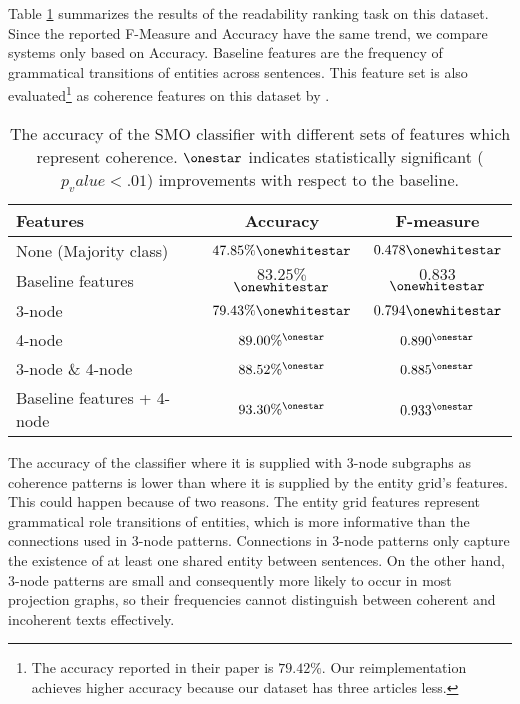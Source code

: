 Table \ref{tab:ranking-pitler} summarizes the results of the readability ranking task on this dataset. 
Since the reported F-Measure and Accuracy have the same trend, we compare systems only based on Accuracy.  
Baseline features are the frequency of grammatical transitions of entities across sentences. 
This feature set is also evaluated\footnote{The accuracy reported in their paper is $79.42\%$. Our reimplementation achieves higher accuracy because our dataset has three articles less.} as coherence features on this dataset by .

\begin{table}[!ht]
	\begin{center}
		\begin{tabular}{lcc}
			\toprule
			\textbf{Features} 				  & \textbf{Accuracy}							& \textbf{F-measure}	\\
			\midrule
			None (Majority class) 			  & $47.85\%\onewhitestar$						& $0.478\onewhitestar$		\\
			Baseline features 			  	  & \underline{$83.25\%$}$\onewhitestar$     		& \underline{$0.833$}$\onewhitestar$		\\
			3-node 							  & $79.43\%\onewhitestar$						& $0.794\onewhitestar$		\\
			4-node 						      & $89.00\%^\onestar$							& $0.890^\onestar$		\\
			3-node \& 4-node 				  & $88.52\%^\onestar$							& $0.885^\onestar$		\\
			Baseline features + 4-node 		  & $93.30\%^\onestar$							& $0.933^\onestar$		\\
			\bottomrule
		\end{tabular}
	\end{center}
	\caption{The accuracy of the SMO classifier with different sets of features which represent coherence. $\onestar$ indicates statistically significant ($p_value<.01$) improvements with respect to the baseline.}   
	\label{tab:ranking-pitler}
\end{table}

The accuracy of the classifier where it is supplied with 3-node subgraphs as coherence patterns is lower than where it is supplied by the entity grid's features.   
This could happen because of two reasons. 
The entity grid features represent grammatical role transitions of entities, which is more informative than the connections used in 3-node patterns.
Connections in 3-node patterns only capture the existence of at least one shared entity between sentences. 
On the other hand, 3-node patterns are small and consequently more likely to occur in most projection graphs, so their frequencies cannot distinguish between coherent and incoherent texts effectively. 

